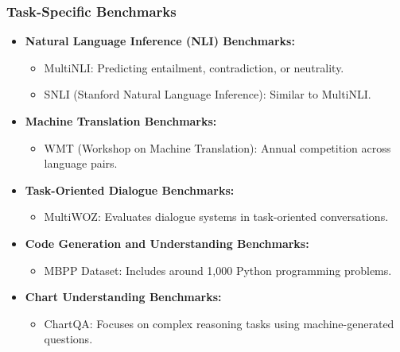 \begin{frame}[fragile]\frametitle{Task-Specific Benchmarks}
  \begin{itemize}
    \item \textbf{Natural Language Inference (NLI) Benchmarks:}
      \begin{itemize}
        \item MultiNLI: Predicting entailment, contradiction, or neutrality.
        \item SNLI (Stanford Natural Language Inference): Similar to MultiNLI.
      \end{itemize}
    \item \textbf{Machine Translation Benchmarks:}
      \begin{itemize}
        \item WMT (Workshop on Machine Translation): Annual competition across language pairs.
      \end{itemize}
    \item \textbf{Task-Oriented Dialogue Benchmarks:}
      \begin{itemize}
        \item MultiWOZ: Evaluates dialogue systems in task-oriented conversations.
      \end{itemize}
    \item \textbf{Code Generation and Understanding Benchmarks:}
      \begin{itemize}
        \item MBPP Dataset: Includes around 1,000 Python programming problems.
      \end{itemize}
    \item \textbf{Chart Understanding Benchmarks:}
      \begin{itemize}
        \item ChartQA: Focuses on complex reasoning tasks using machine-generated questions.
      \end{itemize}
  \end{itemize}
\end{frame}






